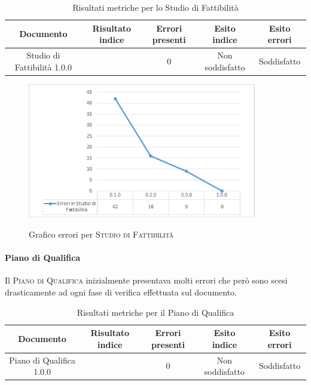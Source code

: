 \documentclass[../piano-di-qualifica.tex]{subfiles}
\begin{document}
\begin{table}[H]
    \centering
    \begin{tabular}{ccccc}
    \hline
    Documento                   & Risultato indice & Errori presenti & Esito indice    & Esito errori \\ \hline
    Studio di Fattibilità 1.0.0 &                  & 0               & Non soddisfatto & Soddisfatto 
    \end{tabular}
    \caption{Risultati metriche per lo Studio di Fattibilità}
    \label{tab:my-table}
\end{table}

    \begin{figure}[H]
        \centering
        \includegraphics[width=10cm]{img/erroriStudio.png}
        \label{fig:scice_documenti}
        \caption{Grafico errori per \textsc{Studio di Fattibilità}}
    \end{figure}

\paragraph{Piano di Qualifica}
\label{sub:piano_di_qualifica}
Il \textsc{Piano di Qualifica} inizialmente presentava molti errori che però sono scesi drasticamente ad ogni fase di verifica effettuata sul documento.

\begin{table}[H]
    \centering
    \begin{tabular}{ccccc}
    \hline
    Documento                & Risultato indice & Errori presenti & Esito indice    & Esito errori \\ \hline
    Piano di Qualifica 1.0.0 &                  & 0               & Non soddisfatto & Soddisfatto 
    \end{tabular}
    \caption{Risultati metriche per il Piano di Qualifica}
    \label{tab:my-table}
\end{table}
\end{document}
